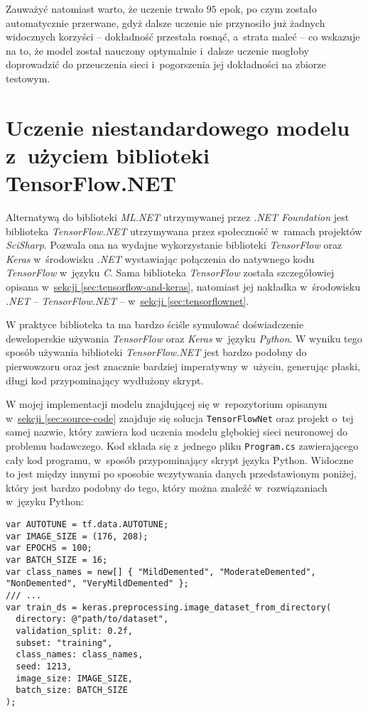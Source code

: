 Zauważyć natomiast warto, że uczenie trwało $95$ epok, po czym zostało automatycznie przerwane, gdyż dalsze uczenie nie przynosiło już żadnych widocznych korzyści -- dokładność przestała rosnąć, a~strata maleć -- co wskazuje na to, że model został nauczony optymalnie i~dalsze uczenie mogłoby doprowadzić do przeuczenia sieci i~pogorszenia jej dokładności na zbiorze testowym.

\section{Uczenie niestandardowego modelu z~użyciem biblioteki TensorFlow.NET}

Alternatywą do biblioteki \emph{ML.NET} utrzymywanej przez \emph{.NET Foundation} jest biblioteka \emph{TensorFlow.NET} utrzymywana przez społeczność w~ramach projektów \emph{SciSharp}.
Pozwala ona na wydajne wykorzystanie biblioteki \emph{TensorFlow} oraz \emph{Keras} w~środowisku \emph{.NET} wystawiając połączenia do natywnego kodu \emph{TensorFlow} w~języku \emph{C}.
Sama biblioteka \emph{TensorFlow} została szczegółowiej opisana w~\hyperref[sec:tensorflow-and-keras]{sekcji \ref*{sec:tensorflow-and-keras}}, natomiast jej nakładka w~środowisku \emph{.NET} -- \emph{TensorFlow.NET} -- w~\hyperref[sec:tensorflownet]{sekcji \ref*{sec:tensorflownet}}.

W praktyce biblioteka ta ma bardzo ściśle symulować doświadczenie deweloperskie używania \emph{TensorFlow} oraz \emph{Keras} w~języku \emph{Python}.
W wyniku tego sposób używania biblioteki \emph{TensorFlow.NET} jest bardzo podobny do pierwowzoru oraz jest znacznie bardziej imperatywny w~użyciu, generując płaski, długi kod przypominający wydłużony skrypt.

W mojej implementacji modelu znajdującej się w~repozytorium opisanym w~\hyperref[sec:source-code]{sekcji \ref*{sec:source-code}} znajduje się solucja \lstinline{TensorFlowNet} oraz projekt o~tej samej nazwie, który zawiera kod uczenia modelu głębokiej sieci neuronowej do problemu badawczego.
Kod składa się z~jednego pliku \lstinline{Program.cs} zawierającego cały kod programu, w~sposób przypominający skrypt języka Python.
Widoczne to jest między innymi po sposobie wczytywania danych przedstawionym poniżej, który jest bardzo podobny do tego, który można znaleźć w~rozwiązaniach w~języku Python:

\begin{lstlisting}[language={[Sharp]C}]
var AUTOTUNE = tf.data.AUTOTUNE;
var IMAGE_SIZE = (176, 208);
var EPOCHS = 100;
var BATCH_SIZE = 16;
var class_names = new[] { "MildDemented", "ModerateDemented", "NonDemented", "VeryMildDemented" };
/// ...
var train_ds = keras.preprocessing.image_dataset_from_directory(
  directory: @"path/to/dataset",
  validation_split: 0.2f,
  subset: "training",
  class_names: class_names,
  seed: 1213,
  image_size: IMAGE_SIZE,
  batch_size: BATCH_SIZE
);
\end{lstlisting}

